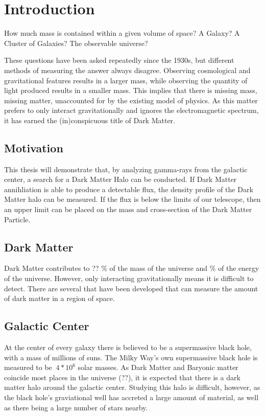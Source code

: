 \cleartooddpage[\thispagestyle{empty}]
\chapter{Introduction}

How much mass is contained within a given volume of space?
A Galaxy?
A Cluster of Galaxies?
The observable universe?

These questions have been asked repeatedly since the 1930s, but different methods of measuring the answer always disagree.
Observing cosmological and gravitational features results in a larger mass, while observing the quantity of light produced results in a smaller mass.
This implies that there is missing mass, missing matter, unaccounted for by the existing model of physics.
As this matter prefers to only interact gravitationally and ignores the electromagnetic spectrum, it has earned the (in)conspicuous title of Dark Matter.

\section{Motivation}
This thesis will demonstrate that, by analyzing gamma-rays from the galactic center, a search for a Dark Matter Halo can be conducted.
If Dark Matter annihliation is able to produce a detectable flux, the density profile of the Dark Matter halo can be measured.
If the flux is below the limits of our telescope, then an upper limit can be placed on the mass and cross-section of the Dark Matter Particle.

\section{Dark Matter}

Dark Matter contributes to ?? \% of the mass of the universe and \% of the energy of the universe.
However, only interacting gravitationally means it is difficult to detect.
There are several that have been developed that can measure the amount of dark matter in a region of space.



\section{Galactic Center}

At the center of every galaxy there is believed to be a supermassive black hole, with a mass of millions of suns.
The Milky Way's own supermassive black hole is measured to be $~4*10^6$ solar masses.
As Dark Matter and Baryonic matter coincide most places in the universe (??), it is expected that there is a dark matter halo around the galactic center.
Studying this halo is difficult, however, as the black hole's graviational well has accreted a large amount of material, as well as there being a large number of stars nearby.

